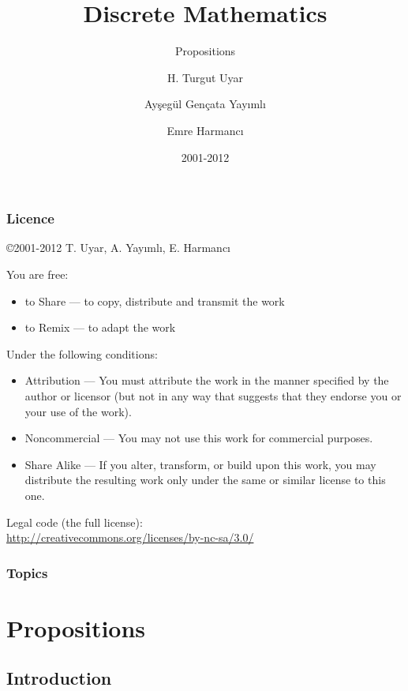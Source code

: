\documentclass[dvipsnames]{beamer}
\title{Discrete Mathematics}
\subtitle{Propositions}
\author{H. Turgut Uyar \and Ayşegül Gençata Yayımlı \and Emre Harmancı}
\date{2001-2012}
\begin{document}
\begin{frame}
  \titlepage
\end{frame}

\begin{frame}
  \frametitle{Licence}

  \hfill
  \copyright 2001-2012 T. Uyar, A. Yayımlı, E. Harmancı

  \vfill
  \begin{tiny}
    You are free:
    \begin{itemize}
      \item to Share — to copy, distribute and transmit the work
      \item to Remix — to adapt the work
    \end{itemize}

    Under the following conditions:
    \begin{itemize}
      \item Attribution — You must attribute the work in the manner specified by
        the author or licensor (but not in any way that suggests that they
        endorse you or your use of the work).

      \item Noncommercial — You may not use this work for commercial purposes.

      \item Share Alike — If you alter, transform, or build upon this work, you
        may distribute the resulting work only under the same or similar license
        to this one.
    \end{itemize}
  \end{tiny}

  \vfill
  Legal code (the full license):\\
  \url{http://creativecommons.org/licenses/by-nc-sa/3.0/}
\end{frame}

\begin{frame}
  \frametitle{Topics}
  \tableofcontents
\end{frame}

\section{Propositions}

\subsection{Introduction}
\end{document}
